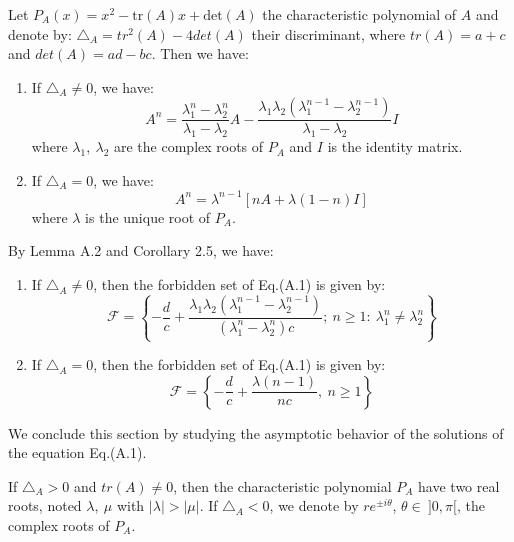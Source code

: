 \documentclass[11pt]{amsart}
\theoremstyle{definition}
\theoremstyle{remark}
\theoremstyle{example}
\numberwithin{equation}{section}
\begin{document}
Let $P_A(x)=x^2-\textrm{tr}(A)x+\textrm{det}(A)$ the characteristic polynomial of $A$ and denote
by: $\triangle_A=tr^2(A)-4det(A)$ their discriminant, where $tr(A)= a+c$ and $det(A)= ad-bc$. Then we have:\\

\Lemma[A.2.]
\vspace{-0.5cm}\begin{enumerate}[leftmargin=*]
  \item If $\triangle_A\neq0$, we have:
  $$A^n=\frac{\lambda_1^n-\lambda_2^n}{\lambda_1-\lambda_2}A-
  \frac{\lambda_1\lambda_2(\lambda_1^{n-1}-\lambda_2^{n-1})}{\lambda_1-\lambda_2}I$$
  where $\lambda_1, \ \lambda_2$ are the complex roots of $P_A$ and $I$ is the identity matrix.
  \item If $\triangle_A=0$, we have:
  $$A^n=\lambda^{n-1}[nA+\lambda(1-n)I]$$
  where $\lambda$ is the unique root of $P_A$.
\end{enumerate}
\medskip
By Lemma A.2 and Corollary 2.5, we have:\\

\Corollary [A.3.]
\vspace{-0.5cm}\begin{enumerate}[leftmargin=*]
  \item If $\triangle_A\neq0$, then the forbidden set of Eq.(A.1) is given by:
  $$\mathcal{F}=\left\{-\frac{d}{c}+ \frac{\lambda_1\lambda_2(\lambda_1^{n-1}-\lambda_2^{n-1})}{(\lambda_1^n-\lambda_2^n)c}; \ n\geq1: \ \lambda_1^n\neq\lambda_2^n\right\}$$
\vspace{1mm}
  \item If $\triangle_A=0$, then the forbidden set of Eq.(A.1) is given by:
  $$\mathcal{F}=\left\{-\frac{d}{c}+ \frac{\lambda(n-1)}{nc}, \ n\geq1\right\}$$
\end{enumerate}

\medskip

We conclude this section by studying the asymptotic behavior of the solutions of the equation Eq.(A.1).\\
\noindent

If $\triangle_A>0$ and $tr(A)\neq0$, then the characteristic polynomial $P_A$ have two real roots, noted
$\lambda, \ \mu$ with $|\lambda|>|\mu|$. If $\triangle_A<0$, we denote by $re^{\pm i\theta}$, $\theta \in \ ]0,\pi[$, the complex roots of $P_A$.\\
\end{document}
